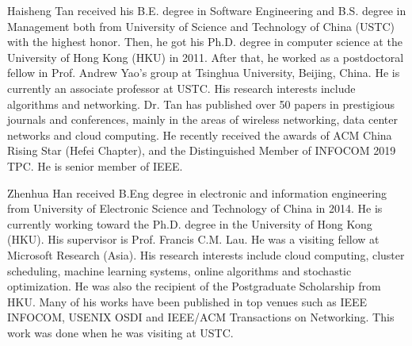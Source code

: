 \begin{IEEEbiography}{Haisheng Tan}
    received his B.E. degree in Software Engineering and B.S. degree in Management both from University of Science and Technology of China (USTC) with the highest honor. Then, he got his Ph.D. degree in computer science at the University of Hong Kong (HKU) in 2011. After that, he worked as a postdoctoral fellow in Prof. Andrew Yao's group at Tsinghua University, Beijing, China. He is currently an associate professor at USTC. His research interests include algorithms and networking. Dr. Tan has published over 50 papers  in prestigious journals and conferences, mainly in the areas of wireless networking, data center networks and cloud computing. He recently received the awards of ACM China Rising Star (Hefei Chapter), and the Distinguished Member of INFOCOM 2019 TPC. He is senior member of IEEE.
\end{IEEEbiography}
\vspace{-1cm}

\begin{IEEEbiography}{Zhenhua Han}
    received B.Eng degree in electronic and information engineering from University of Electronic Science and Technology of China in 2014. He is currently working toward the Ph.D. degree in the University of Hong Kong (HKU). His supervisor is Prof. Francis C.M. Lau. He was a visiting fellow at Microsoft Research (Asia). His research interests include cloud computing, cluster scheduling, machine learning systems, online algorithms and stochastic optimization. He was also the recipient of the Postgraduate Scholarship from HKU. Many of his works have been published in top venues such as IEEE INFOCOM, USENIX OSDI and IEEE/ACM Transactions on Networking. This work was done when he was visiting at USTC.
\end{IEEEbiography}
\vspace{-1cm}

